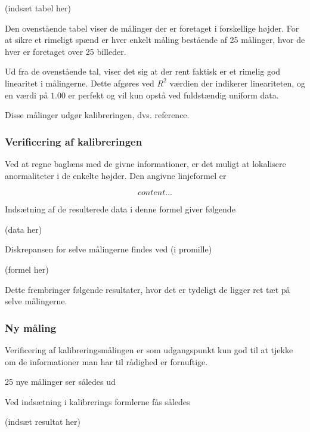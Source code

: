 (indsæt tabel her)


Den ovenstående tabel viser de målinger der er foretaget i forskellige højder. For at sikre et rimeligt spænd er hver enkelt måling bestående af 25 målinger, hvor de hver er foretaget over 25 billeder.

Ud fra de ovenstående tal, viser det sig at der rent faktisk er et rimelig god linearitet i målingerne.
Dette afgøres ved $R^2$ værdien der indikerer lineariteten, og en værdi på $1.00$ er perfekt og vil kun opstå ved fuldstændig uniform data.

Disse målinger udgør kalibreringen, dvs. reference.

\subsubsection{Verificering af kalibreringen}

Ved at regne baglæns med de givne informationer, er det muligt at lokalisere anormaliteter i de enkelte højder.
Den angivne linjeformel er

\begin{equation}
content...
\end{equation}

Indsætning af de resulterede data i denne formel giver følgende

(data her)


Diskrepansen for selve målingerne findes ved (i promille)

(formel her)


Dette frembringer følgende resultater, hvor det er tydeligt de ligger ret tæt på selve målingerne.



\subsubsection{Ny måling}

Verificering af kalibreringsmålingen er som udgangspunkt kun god til at tjekke om de informationer man har til rådighed er fornuftige.

25 nye målinger ser således ud

Ved indsætning i kalibrerings formlerne fås således

(indsæt resultat her)


